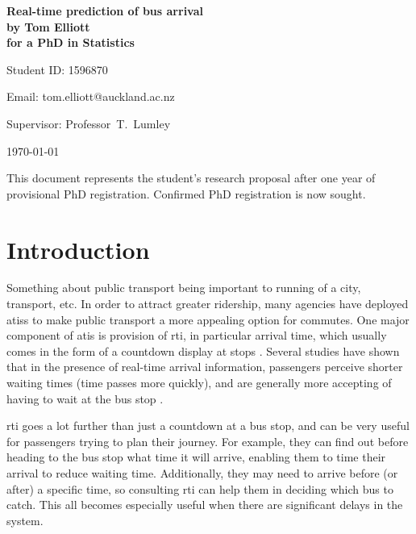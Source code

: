 \documentclass[12pt,a4paper]{article}
\begin{document}
\begin{Large}
\begin{center}
\textbf{Real-time prediction of bus arrival} \\
\textbf{by Tom Elliott} \\
\textbf{for a PhD in Statistics}
\end{center}
\end{Large}


\hfill{Student ID: 1596870}

\hfill{Email: tom.elliott@auckland.ac.nz}

Supervisor: Professor~T.~Lumley




\begin{center}
\today
\end{center}


This document represents the student's research proposal after
one year of provisional PhD registration.
Confirmed PhD registration is now sought.




\section{Introduction}
\label{sec:intro}

Something about public transport being important to running of a city, transport, etc.
In order to attract greater ridership, many agencies have deployed \glspl{atis}
to make public transport a more appealing option for commutes.
One major component of \gls{atis} is provision of \gls{rti},
in particular arrival time,
which usually comes in the form of a countdown display at stops
\citep{cn}.
Several studies have shown that in the presence of real-time arrival information,
passengers perceive shorter waiting times (time passes more quickly),
and are generally more accepting of having to wait at the bus stop
\citep{tcrp:2003}.


\gls{rti} goes a lot further than just a countdown at a bus stop,
and can be very useful for passengers trying to plan their journey.
For example, they can find out before heading to the bus stop what time it will arrive,
enabling them to time their arrival to reduce waiting time.
Additionally, they may need to arrive before (or after) a specific time,
so consulting \gls{rti} can help them in deciding which bus to catch.
This all becomes especially useful when there are significant delays in the system.
\end{document}
